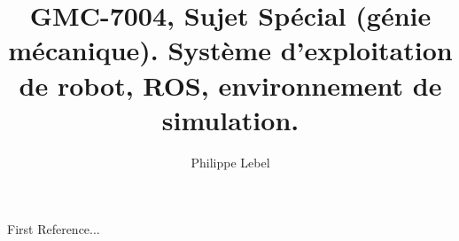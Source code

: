 \documentclass{articleUL}
\title{GMC-7004, Sujet Spécial (génie mécanique). Système d'exploitation de robot, ROS, environnement de simulation.}
\author{Philippe Lebel
 \affiliation{Université Laval, philippe.lebel.4@ulaval.ca}}
\begin{document}
 \maketitle
 
 
 
 \begin{thebibliography}{}
  First Reference...
 \end{thebibliography}
 
\end{document}
